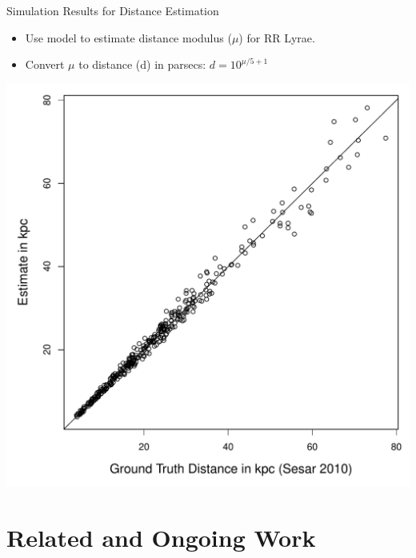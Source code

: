 \documentclass[12pt]{beamer}
\begin{document}
\begin{frame}{Simulation Results for Distance Estimation}
\begin{itemize}
\item Use model to estimate distance modulus ($\mu$) for RR Lyrae.
\item Convert $\mu$ to distance (d) in parsecs: $d = 10^{\mu/5 + 1}$
\end{itemize}

\begin{center}
\includegraphics[scale=.35]{figs/distance_comparison.pdf}
\end{center}



\end{frame}


\section{Related and Ongoing Work}
\end{document}
